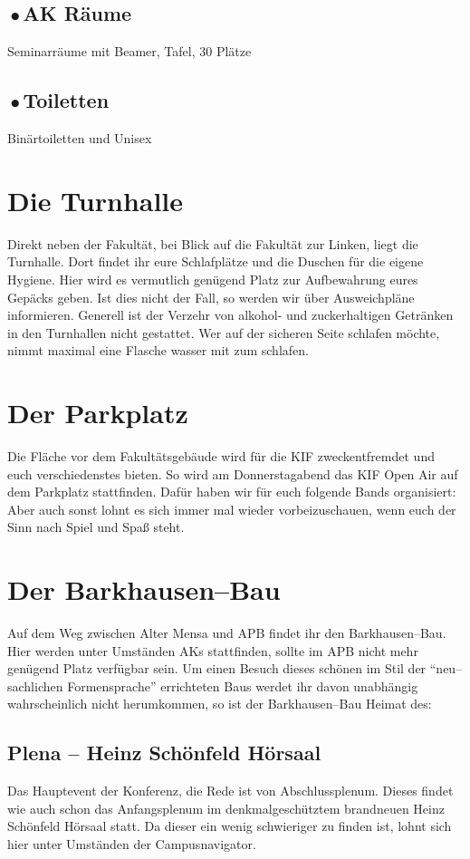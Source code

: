 \subsection*{{\,\color{ShirtAttendee}$\bullet$\,}AK Räume}
Seminarräume mit Beamer, Tafel, 30 Plätze

\subsection*{{\,\color{ShirtAttendee}$\bullet$\,}Toiletten}
Binärtoiletten und Unisex

\section*{Die Turnhalle}
Direkt neben der Fakultät, bei Blick auf die Fakultät zur Linken, liegt die Turnhalle.
Dort findet ihr eure Schlafplätze und die Duschen für die eigene Hygiene.
Hier wird es vermutlich genügend Platz zur Aufbewahrung eures Gepäcks geben.
Ist dies nicht der Fall, so werden wir über Ausweichpläne informieren.
Generell ist der Verzehr von alkohol- und zuckerhaltigen Getränken in den Turnhallen nicht gestattet.
Wer auf der sicheren Seite schlafen möchte, nimmt maximal eine Flasche wasser mit zum schlafen.

\section*{Der Parkplatz}
Die Fläche vor dem Fakultätsgebäude wird für die KIF zweckentfremdet und euch verschiedenstes bieten.  So wird am Donnerstagabend das KIF Open Air auf dem Parkplatz stattfinden. Dafür haben wir für euch folgende Bands organisiert:
Aber auch sonst lohnt es sich immer mal wieder vorbeizuschauen, wenn euch der Sinn nach Spiel und Spaß steht.

\section*{Der Barkhausen--Bau}
Auf dem Weg zwischen Alter Mensa und APB findet ihr den Barkhausen--Bau.
Hier werden unter Umständen AKs stattfinden, sollte im APB nicht mehr genügend Platz verfügbar sein.
Um einen Besuch dieses schönen im Stil der \enquote{neu--sachlichen Formensprache} errichteten Baus werdet ihr davon unabhängig wahrscheinlich nicht herumkommen, so ist der Barkhausen--Bau Heimat des:

\subsection*{Plena -- Heinz Schönfeld Hörsaal}
Das Hauptevent der Konferenz, die Rede ist von Abschlussplenum.
Dieses findet wie auch schon das Anfangsplenum im denkmalgeschütztem brandneuen Heinz Schönfeld Hörsaal statt.
Da dieser ein wenig schwieriger zu finden ist, lohnt sich hier unter Umständen der Campusnavigator.

